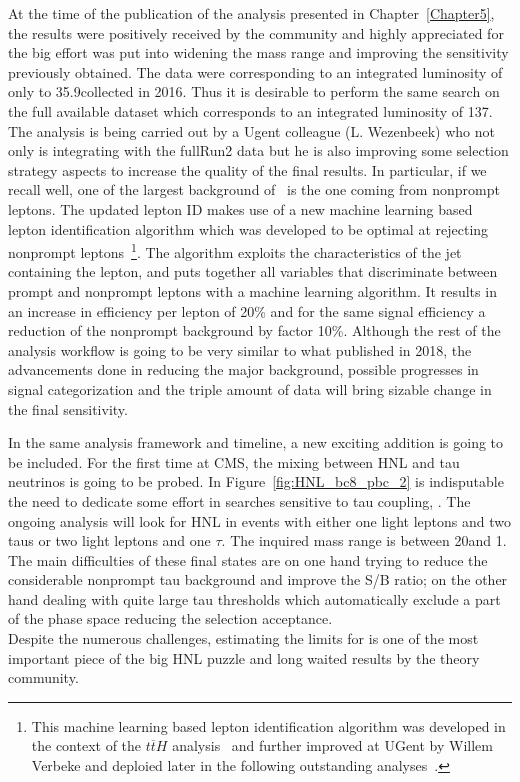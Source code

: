 At the time of the publication of the analysis presented in
Chapter~\ref{Chapter5}, the results were positively received by the community and highly appreciated
for the big effort was put into widening the mass range and
improving the sensitivity previously obtained. The
data were corresponding to an integrated luminosity of only to
35.9\fbinv collected in 2016. Thus it is desirable to perform the same
search on the full available dataset which corresponds to an integrated luminosity of 
137\fbinv. \\
The analysis is being carried out by a Ugent colleague (L. Wezenbeek)
who not only is integrating with the fullRun2 data but he is also improving
some selection strategy aspects to increase the quality of the final
results. In particular, if we recall well, one of the largest
background of~\cite{Sirunyan:2018mtv} is the one coming from nonprompt
leptons. The updated lepton ID makes use of a new machine learning
based lepton identification algorithm which was developed to be
optimal at rejecting nonprompt leptons~\footnote{This machine learning
based lepton identification algorithm was developed in the context of
the $t\overline{t}H$ analysis~\cite{Sirunyan_2018_ttH} and further improved at UGent by Willem
Verbeke and deploied later in the following outstanding
analyses~\cite{CMS:2018sgc_tzq, Sirunyan_2021_higgsmumu}.}. The algorithm exploits the
characteristics of the jet containing the lepton, and puts together all
variables that discriminate between prompt and
nonprompt leptons with a machine learning algorithm. It results in an increase in efficiency
per lepton of 20\% and for the same signal
efficiency a reduction of the
nonprompt background
by factor 10\%. Although the rest of the analysis workflow is going to be very
similar to what published in 2018, the advancements done in reducing the
major background, possible progresses in signal categorization and the
triple amount of data will bring sizable change in the final
sensitivity.

In the same analysis framework and timeline, a new exciting addition
is going to be included. For the first time at CMS, the mixing between
HNL and tau neutrinos is going to be probed. In
Figure~\ref{fig:HNL_bc8_pbc_2} is indisputable the need to dedicate
some effort in searches sensitive to tau coupling, \mixpart. The
ongoing analysis will look for HNL in events with either one light leptons
and two taus or two light leptons and one $\tau$. The inquired mass
range is between 20\GeV and 1\TeV. The main difficulties of these final
states are on one hand trying to reduce the considerable nonprompt tau background and
improve the S/B ratio; on the other hand dealing with quite large tau
\pt thresholds which automatically exclude a part of the phase space
reducing the selection acceptance. \\
Despite the numerous challenges, estimating the limits for \mixpart is
one of the most important piece of the big HNL puzzle and long waited results
by the theory community.  

